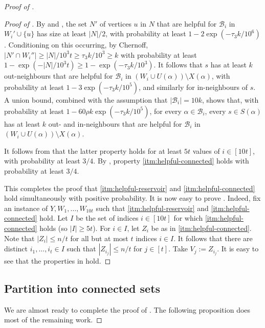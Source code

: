 \documentclass[english]{article}
\theoremstyle{plain}
\theoremstyle{remark}
\def\B{\mathcal{B}}
\begin{document}
\begin{proof}[Proof of ]
\begin{proof} [Proof of ]
			By  and , the set $N'$ of vertices $u$ in $N$ that are helpful for $\B_i$ in $W_i' \cup \{u\}$ has size at least $|N|/2$, with probability at least $1 - 2\exp(-\tau_3 k / 10^6)$. Conditioning on this occurring, by Chernoff, $|N' \cap W_i''| \ge |N|/10^3 t \ge \tau_3 k / 10^3 \ge k$ with probability at least $1 - \exp(-|N| / 10^3 t) \ge 1 - \exp(-\tau_3 k / 10^3)$. It follows that $s$ has at least $k$ out-neighbours that are helpful for $\B_i$ in $(W_i \cup U(\alpha)) \setminus X(\alpha)$, with probability at least $1 - 3\exp(-\tau_3 k/10^5)$, and similarly for in-neighbours of $s$.
			A union bound, combined with the assumption that $|\B_i| = 10k$, shows that, with probability at least $1 - 60\rho k \exp(-\tau_3k / 10^5)$, for every $\alpha \in \B_i$, every $s \in S(\alpha)$ has at least $k$ out- and in-neighbours that are helpful for $\B_i$ in $(W_i \cup U(\alpha)) \setminus X(\alpha)$. 
			
			It follows from  that the latter property holds for at least $5t$ values of $i \in [10t]$, with probability at least $3/4$. 
			By , property \ref{itm:helpful-connected} holds with probability at least $3/4$. 

			This completes the proof that \ref{itm:helpful-reservoir} and \ref{itm:helpful-connected} hold simultaneously with positive probability. It is now easy to prove . Indeed, fix an instance of $Y, W_1, \ldots, W_{10t}$ such that \ref{itm:helpful-reservoir} and \ref{itm:helpful-connected} hold. Let $I$ be the set of indices $i \in [10t]$ for which \ref{itm:helpful-connected} holds (so $|I| \ge 5t$). For $i \in I$, let $Z_i$ be as in \ref{itm:helpful-connected}. Note that $|Z_i| \le n/t$ for all but at most $t$ indices $i \in I$. It follows that there are distinct $i_1, \ldots, i_{t} \in I$ such that $|Z_{i_j}| \le n/t$ for $j \in [t]$. Take $V_j := Z_{i_j}$. It is easy to see that the properties in  hold.
		\end{proof}

	\subsection{Partition into connected sets} \label{subsec:partition}

		We are almost ready to complete the proof of .
		The following proposition does most of the remaining work.


\end{proof}
\end{document}
